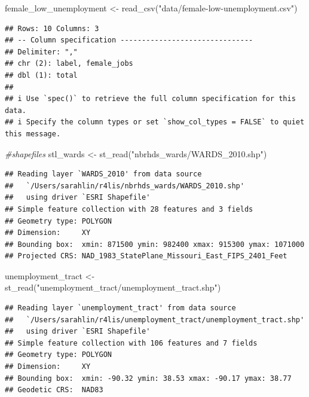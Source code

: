 \documentclass[
  krantz2]{krantz}
\makeatletter
\newenvironment{Shaded}{\begin{snugshade}}{\end{snugshade}}
\newcommand{\CommentTok}[1]{\textcolor[rgb]{0.37,0.37,0.37}{\textit{#1}}}
\newcommand{\FunctionTok}[1]{\textcolor[rgb]{0,0,0}{#1}}
\newcommand{\NormalTok}[1]{#1}
\newcommand{\OtherTok}[1]{\textcolor[rgb]{0.37,0.37,0.37}{#1}}
\newcommand{\StringTok}[1]{\textcolor[rgb]{0.5,0.5,0.5}{#1}}
\newenvironment{kframe}{%
\medskip{}
\setlength{\fboxsep}{.8em}
 \def\at@end@of@kframe{}%
 \ifinner\ifhmode%
  \def\at@end@of@kframe{\end{minipage}}%
  \begin{minipage}{\columnwidth}%
 \fi\fi%
 \def\FrameCommand##1{\hskip\@totalleftmargin \hskip-\fboxsep
 \colorbox{shadecolor}{##1}\hskip-\fboxsep
     \hskip-\linewidth \hskip-\@totalleftmargin \hskip\columnwidth}%
 \MakeFramed {\advance\hsize-\width
   \@totalleftmargin\z@ \linewidth\hsize
   \@setminipage}}%
 {\par\unskip\endMakeFramed%
 \at@end@of@kframe}
\renewenvironment{Shaded}{\begin{kframe}}{\end{kframe}}
\makeatother
\begin{document}
\begin{Shaded}
\begin{Highlighting}[]
\NormalTok{female\_low\_unemployment }\OtherTok{\textless{}{-}} \FunctionTok{read\_csv}\NormalTok{(}\StringTok{"data/female{-}low{-}unemployment.csv"}\NormalTok{)}
\end{Highlighting}
\end{Shaded}

\begin{verbatim}
## Rows: 10 Columns: 3
## -- Column specification -------------------------------
## Delimiter: ","
## chr (2): label, female_jobs
## dbl (1): total
##
## i Use `spec()` to retrieve the full column specification for this data.
## i Specify the column types or set `show_col_types = FALSE` to quiet this message.
\end{verbatim}

\begin{Shaded}
\begin{Highlighting}[]
\CommentTok{\#shapefiles}
\NormalTok{stl\_wards }\OtherTok{\textless{}{-}} \FunctionTok{st\_read}\NormalTok{(}\StringTok{"nbrhds\_wards/WARDS\_2010.shp"}\NormalTok{)}
\end{Highlighting}
\end{Shaded}

\begin{verbatim}
## Reading layer `WARDS_2010' from data source
##   `/Users/sarahlin/r4lis/nbrhds_wards/WARDS_2010.shp'
##   using driver `ESRI Shapefile'
## Simple feature collection with 28 features and 3 fields
## Geometry type: POLYGON
## Dimension:     XY
## Bounding box:  xmin: 871500 ymin: 982400 xmax: 915300 ymax: 1071000
## Projected CRS: NAD_1983_StatePlane_Missouri_East_FIPS_2401_Feet
\end{verbatim}

\begin{Shaded}
\begin{Highlighting}[]
\NormalTok{unemployment\_tract }\OtherTok{\textless{}{-}} \FunctionTok{st\_read}\NormalTok{(}\StringTok{"unemployment\_tract/unemployment\_tract.shp"}\NormalTok{)}
\end{Highlighting}
\end{Shaded}

\begin{verbatim}
## Reading layer `unemployment_tract' from data source
##   `/Users/sarahlin/r4lis/unemployment_tract/unemployment_tract.shp'
##   using driver `ESRI Shapefile'
## Simple feature collection with 106 features and 7 fields
## Geometry type: POLYGON
## Dimension:     XY
## Bounding box:  xmin: -90.32 ymin: 38.53 xmax: -90.17 ymax: 38.77
## Geodetic CRS:  NAD83
\end{verbatim}
\end{document}
